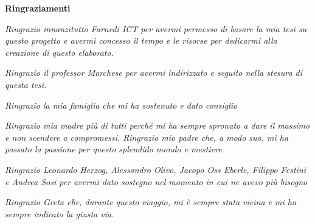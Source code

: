 \thispagestyle{empty}

\begin{center}
  {\bf \Huge Ringraziamenti}
\end{center}

\vspace{4cm}


\emph{
  Ringrazio innanzitutto Farnedi ICT per avermi permesso di basare la mia tesi su questo progetto e avermi concesso il tempo e le risorse per dedicarmi alla creazione di questo elaborato.}	\vspace{5mm}
  
  \emph{
  Ringrazio il professor Marchese per avermi indirizzato e seguito nella stesura di questa tesi.}	\vspace{5mm}
  
  \emph{
 Ringrazio la mia famiglia che mi ha sostenuto e dato consiglio}	\vspace{5mm}
 
  \emph{
 Ringrazio mia madre più di tutti perché mi ha sempre spronato a dare il massimo e non scendere a compromessi. Ringrazio mio padre che, a modo suo, mi ha passato la passione per questo splendido mondo e mestiere}	\vspace{5mm}
 
 \emph{
 Ringrazio Leonardo Herzog, Alessandro Olivo, Jacopo Oss Eberle, Filippo Festini e Andrea Sosi per avermi dato sostegno nel momento in cui ne avevo più bisogno}	\vspace{5mm}
 
 \emph{
  Ringrazio Greta che, durante questo viaggio, mi è sempre stata vicina e mi ha sempre indicato la giusta via.}	\vspace{5mm}
